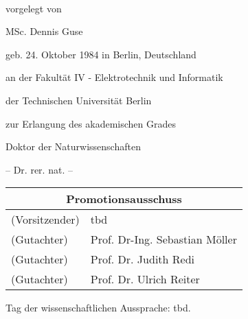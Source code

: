 \begin{titlepage}
    \begin{addmargin}[-1cm]{-3cm}
    \begin{center}
        \large  

        \hfill

        \vfill

        \begingroup
            \color{Maroon}\spacedallcaps{\myTitle} \\ \bigskip
        \endgroup

				\vspace{0.7cm}	
				vorgelegt von
				
				\vspace{0.7cm}	
				MSc. Dennis Guse
				
				geb. 24. Oktober 1984 in Berlin, Deutschland

				\vspace{1.7cm}
				an der Fakultät IV - Elektrotechnik und Informatik
				
				der Technischen Universität Berlin
				
				zur Erlangung des akademischen Grades

				\vspace{0.7cm}
				Doktor der Naturwissenschaften
				
				-- Dr. rer. nat. --

				\vspace{2.2cm}
				
				\centering
				\large
				\begin{tabular}{ll}
				\multicolumn{2}{c}{Promotionsausschuss} \\
				\hline				
				(Vorsitzender) & tbd \\
				(Gutachter)	& Prof. Dr-Ing. Sebastian Möller \\
				(Gutachter)	& Prof. Dr. Judith Redi \\
				(Gutachter)	& Prof. Dr. Ulrich Reiter \\
				\end{tabular}
				
				\vspace{1.7cm}				
				Tag der wissenschaftlichen Aussprache: tbd.


\end{center}
\end{addmargin}
\end{titlepage}
